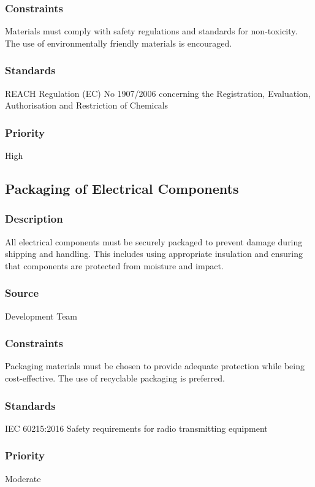 \subsubsection{Constraints}
Materials must comply with safety regulations and standards for non-toxicity. The use of environmentally friendly materials is encouraged.
\subsubsection{Standards}
REACH Regulation (EC) No 1907/2006 concerning the Registration, Evaluation, Authorisation and Restriction of Chemicals
\subsubsection{Priority}
High

\subsection{Packaging of Electrical Components}
\subsubsection{Description}
All electrical components must be securely packaged to prevent damage during shipping and handling. This includes using appropriate insulation and ensuring that components are protected from moisture and impact.
\subsubsection{Source}
Development Team
\subsubsection{Constraints}
Packaging materials must be chosen to provide adequate protection while being cost-effective. The use of recyclable packaging is preferred.
\subsubsection{Standards}
IEC 60215:2016 Safety requirements for radio transmitting equipment
\subsubsection{Priority}
Moderate
